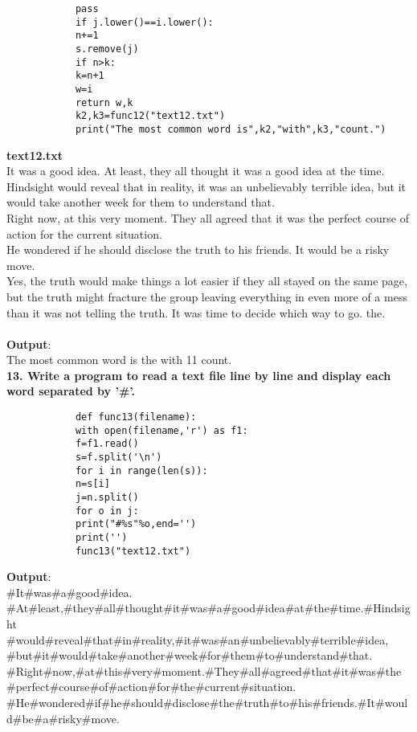 \documentclass[
a4paper]{article}
\begin{document}
\begin{large}
\begin{verbatim}
			pass
			if j.lower()==i.lower():
			n+=1
			s.remove(j)
			if n>k:
			k=n+1
			w=i    
			return w,k
			k2,k3=func12("text12.txt")
			print("The most common word is",k2,"with",k3,"count.")
		\end{verbatim}
		\textbf{text12.txt}\\
		It was a good idea. 
		At least, they all thought it was a good idea at the time. Hindsight would reveal that in reality, it was an unbelievably terrible idea, but it would take another week for them to understand that. \\
		Right now, at this very moment. They all agreed that it was the perfect course of action for the current situation.\\
		He wondered if he should disclose the truth to his friends. It would be a risky move. \\
		Yes, the truth would make things a lot easier if they all stayed on the same page, but the truth might fracture the group leaving everything in even more of a mess than it was not telling the truth. It was time to decide which way to go. the.\\
		\textbf{\\Output}:\\
		The most common word is the with 11 count.
		\textbf{\\13. Write a program to read a text file line by line and display each word separated by '\#'.}
		\begin{verbatim}
			def func13(filename):
			with open(filename,'r') as f1:
			f=f1.read()
			s=f.split('\n')
			for i in range(len(s)):
			n=s[i]
			j=n.split()
			for o in j:
			print("#%s"%o,end='')
			print('')
			func13("text12.txt")
		\end{verbatim}
		\textbf{Output}:\\
		\#It\#was\#a\#good\#idea.\\
		\#At\#least,\#they\#all\#thought\#it\#was\#a\#good\#idea\#at\#the\#time.\#Hindsight\\\#would\#reveal\#that\#in\#reality,\#it\#was\#an\#unbelievably\#terrible\#idea,\\\#but\#it\#would\#take\#another\#week\#for\#them\#to\#understand\#that.\\
		\#Right\#now,\#at\#this\#very\#moment.\#They\#all\#agreed\#that\#it\#was\#the\\\#perfect\#course\#of\#action\#for\#the\#current\#situation.\\
		\#He\#wondered\#if\#he\#should\#disclose\#the\#truth\#to\#his\#friends.\#It\#would\#be\#a\#risky\#move.\\

\end{large}
\end{document}
